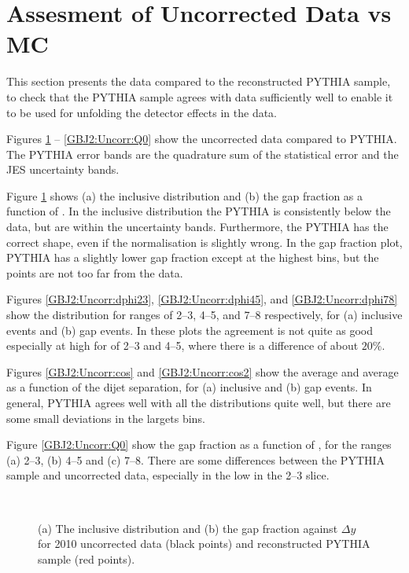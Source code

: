 \section{Assesment of Uncorrected Data vs MC}
\label{sec:GBJ2:Uncorr}
This section presents the data compared to the reconstructed PYTHIA sample, to check that the PYTHIA sample agrees with data sufficiently well to enable it to be used for unfolding the detector effects in the data.

Figures \ref{GBJ2:Uncorr:Incl_Gap} -- \ref{GBJ2:Uncorr:Q0} show the uncorrected data compared to PYTHIA.
The PYTHIA error bands are the quadrature sum of the statistical error and the JES uncertainty bands. 

Figure \ref{GBJ2:Uncorr:Incl_Gap} shows (a) the inclusive distribution and (b) the gap fraction as a function of \dy{}.
In the inclusive distribution the PYTHIA is consistently below the data, but are within the uncertainty bands.
Furthermore, the PYTHIA has the correct shape, even if the normalisation is slightly wrong.
In the gap fraction plot, PYTHIA has a slightly lower gap fraction except at the highest \dy{} bins, but the points are not too far from the data.

Figures \ref{GBJ2:Uncorr:dphi23}, \ref{GBJ2:Uncorr:dphi45}, and \ref{GBJ2:Uncorr:dphi78} show the \dphi{} distribution for \dy{} ranges of 2--3, 4--5, and 7--8 respectively, for (a) inclusive events and (b) gap events.
In these \dphi{} plots the agreement is not quite as good especially at high \dphi{} for \dy{} of 2--3 and 4--5, where there is a difference of about $20\%$. 

Figures \ref{GBJ2:Uncorr:cos} and \ref{GBJ2:Uncorr:cos2} show the average \cosdphi{} and average \costwodphi{} as a function of the dijet separation, \dy{} for (a) inclusive and (b) gap events.
In general, PYTHIA agrees well with all the distributions quite well, but there are some small deviations in the largets \dy{} bins. 

Figure \ref{GBJ2:Uncorr:Q0} show the gap fraction as a function of \qz{}, for the \dy{} ranges (a) 2--3, (b) 4--5 and (c) 7--8.
There are some differences between the PYTHIA sample and uncorrected data, especially in the low \qz{} in the 2--3 \dy{} slice.


\begin{figure}
\centering
\mbox{
              \quad
              \quad
                              }
\caption[]{
(a) The inclusive distribution and (b) the gap fraction against $\Delta y$ for 2010 uncorrected data (black points) and reconstructed PYTHIA sample (red points).
\label{GBJ2:Uncorr:Incl_Gap}}
\end{figure}



